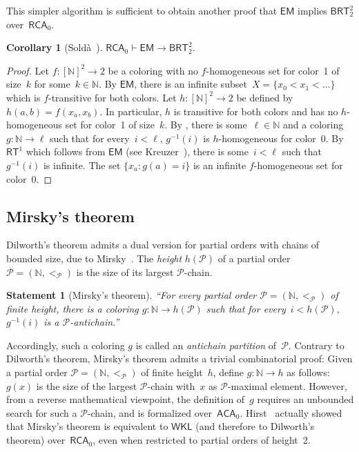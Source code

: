 \documentclass{article}
\def\P{\mathcal{P}}
\newcommand{\RCA}[0]{\mathsf{RCA}}
\newcommand{\WKL}[0]{\mathsf{WKL}}
\newcommand{\ACA}[0]{\mathsf{ACA}}
\newcommand{\EM}[0]{\mathsf{EM}}
\newcommand{\RT}[0]{\mathsf{RT}}
\newcommand{\BRT}[0]{\mathsf{BRT}}
\newcommand{\NN}[0]{\mathbb{N}}
\def\qt#1{``#1''}%
\newtheorem*{statement}{Statement}
\numberwithin{theorem}{section}
\newtheorem{corollary}[theorem]{Corollary}
\begin{document}
This simpler algorithm is sufficient to obtain another proof that $\EM$ implies $\BRT^2_2$ over~$\RCA_0$.

\begin{corollary}[{Soldà~\cite[Theorem 4.1.10]{solda2021calibrating}}]
$\RCA_0 \vdash \EM \to \BRT^2_2$.
\end{corollary}
\begin{proof}
Let $f : [\NN]^2 \to 2$ be a coloring with no $f$-homogeneous set for color~1 of size~$k$ for some~$k \in \NN$.
By $\EM$, there is an infinite subset~$X = \{ x_0 < x_1 < \dots \}$ which is $f$-transitive for both colors. 
Let $h : [\NN]^2 \to 2$ be defined by $h(a, b) = f(x_a, x_b)$. In particular, $h$ is transitive for both colors and has no $h$-homogeneous set for color~1 of size~$k$. By , there is some~$\ell \in \NN$ and a coloring $g : \NN \to \ell$ such that for every~$i < \ell$, $g^{-1}(i)$ is $h$-homogeneous for color~0. By $\RT^1$ which follows from $\EM$ (see Kreuzer~\cite{kreuzer2012primitive}), there is some~$i < \ell$ such that $g^{-1}(i)$ is infinite. The set $\{ x_a : g(a) = i \}$ is an infinite $f$-homogeneous set for color~0.
\end{proof}


\subsection{Mirsky's theorem}

Dilworth's theorem admits a dual version for partial orders with chains of bounded size, due to Mirsky~\cite{mirsky1971dual}.
The \emph{height} $h(\P)$ of a partial order $\P = (\NN, <_\P)$ is the size of its largest $\P$-chain.

\begin{statement}[Mirsky's theorem]
\qt{For every partial order $\P = (\NN, <_\P)$ of finite height, there is a coloring $g : \NN \to h(\P)$ such that for every~$i < h(\P)$, $g^{-1}(i)$ is a $\P$-antichain.}
\end{statement}

Accordingly, such a coloring $g$ is called an \emph{antichain partition} of~$\P$.  Contrary to Dilworth's theorem, Mirsky's theorem admits a trivial combinatorial proof: Given a partial order $\P = (\NN, <_\P)$ of finite height~$h$, define $g : \NN \to h$ as follows: $g(x)$ is the size of the largest $\P$-chain with~$x$ as $\P$-maximal element. However, from a reverse mathematical viewpoint, the definition of~$g$ requires an unbounded search for such a $\P$-chain, and is formalized over~$\ACA_0$. Hirst~\cite{hirst1987combinatorics} actually showed that Mirsky's theorem is equivalent to $\WKL$ (and therefore to Dilworth's theorem) over~$\RCA_0$, even when restricted to partial orders of height~2.
\end{document}

